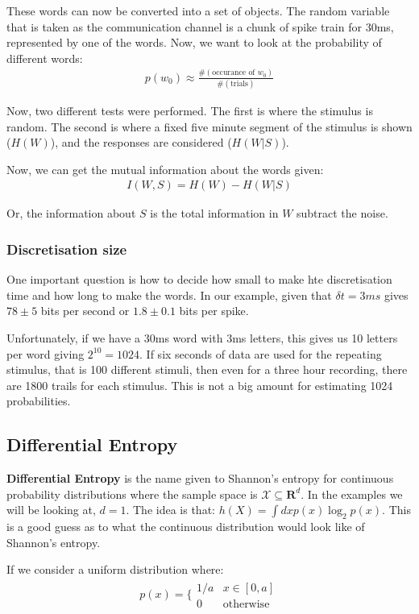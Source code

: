 \documentclass[11pt,a4paper,titlepage,dvipsnames,cmyk]{scrartcl}
\begin{document}
These words can now be converted into a set of objects. The random variable that is taken as the communication channel is a chunk of spike train for 30ms, represented by one of the words. Now, we want to look at the probability of different words:
\begin{align*}
p(w_0) \approx \frac{\#(\text{occurance of } w_0)}{\# (\text{trials})}
\end{align*}

Now, two different tests were performed. The first is where the stimulus is random. The second is where a fixed five minute segment of the stimulus is shown ($H(W)$), and the responses are considered ($H(W|S)$). 

Now, we can get the mutual information about the words given:
\begin{align*}
I(W,S) = H(W) - H(W|S)
\end{align*}

Or, the information about $S$ is the total information in $W$ subtract the noise.

\subsubsection{Discretisation size}
One important question is how to decide how small to make hte discretisation time and how long to make the words. In our example, given that $\delta t = 3ms$ gives $78 \pm 5$ bits per second or $1.8 \pm 0.1$ bits per spike.

Unfortunately, if we have a 30ms word with 3ms letters, this gives us 10 letters per word giving $2^{10} = 1024$. If six seconds of data are used for the repeating stimulus, that is 100 different stimuli, then even for a three hour recording, there are 1800 trails for each stimulus. This is not a big amount for estimating 1024 probabilities.

\subsection{Differential Entropy}
\textbf{Differential Entropy} is the name given to Shannon's entropy for continuous probability distributions where the sample space is $\mathcal{X} \subseteq \mathbf{R}^d$. In the examples we will be looking at, $d = 1$. The idea is that: $h(X) = \int dxp(x) \log_2 p(x)$. This is a good guess as to what the continuous distribution would look like of Shannon's entropy.

If we consider a uniform distribution where:
\begin{align*}
p(x) = \bigg \{ \begin{matrix}
    1/a & x \in [0,a] \\
    0 & \text{otherwise}
\end{matrix}
\end{align*}
\end{document}
